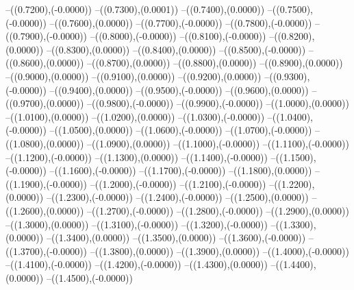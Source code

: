 {	--({\sx*(0.7200)},{\sy*(-0.0000)})
	--({\sx*(0.7300)},{\sy*(0.0001)})
	--({\sx*(0.7400)},{\sy*(0.0000)})
	--({\sx*(0.7500)},{\sy*(-0.0000)})
	--({\sx*(0.7600)},{\sy*(0.0000)})
	--({\sx*(0.7700)},{\sy*(-0.0000)})
	--({\sx*(0.7800)},{\sy*(-0.0000)})
	--({\sx*(0.7900)},{\sy*(-0.0000)})
	--({\sx*(0.8000)},{\sy*(-0.0000)})
	--({\sx*(0.8100)},{\sy*(-0.0000)})
	--({\sx*(0.8200)},{\sy*(0.0000)})
	--({\sx*(0.8300)},{\sy*(0.0000)})
	--({\sx*(0.8400)},{\sy*(0.0000)})
	--({\sx*(0.8500)},{\sy*(-0.0000)})
	--({\sx*(0.8600)},{\sy*(0.0000)})
	--({\sx*(0.8700)},{\sy*(0.0000)})
	--({\sx*(0.8800)},{\sy*(0.0000)})
	--({\sx*(0.8900)},{\sy*(0.0000)})
	--({\sx*(0.9000)},{\sy*(0.0000)})
	--({\sx*(0.9100)},{\sy*(0.0000)})
	--({\sx*(0.9200)},{\sy*(0.0000)})
	--({\sx*(0.9300)},{\sy*(-0.0000)})
	--({\sx*(0.9400)},{\sy*(0.0000)})
	--({\sx*(0.9500)},{\sy*(-0.0000)})
	--({\sx*(0.9600)},{\sy*(0.0000)})
	--({\sx*(0.9700)},{\sy*(0.0000)})
	--({\sx*(0.9800)},{\sy*(-0.0000)})
	--({\sx*(0.9900)},{\sy*(-0.0000)})
	--({\sx*(1.0000)},{\sy*(0.0000)})
	--({\sx*(1.0100)},{\sy*(0.0000)})
	--({\sx*(1.0200)},{\sy*(0.0000)})
	--({\sx*(1.0300)},{\sy*(-0.0000)})
	--({\sx*(1.0400)},{\sy*(-0.0000)})
	--({\sx*(1.0500)},{\sy*(0.0000)})
	--({\sx*(1.0600)},{\sy*(-0.0000)})
	--({\sx*(1.0700)},{\sy*(-0.0000)})
	--({\sx*(1.0800)},{\sy*(0.0000)})
	--({\sx*(1.0900)},{\sy*(0.0000)})
	--({\sx*(1.1000)},{\sy*(-0.0000)})
	--({\sx*(1.1100)},{\sy*(-0.0000)})
	--({\sx*(1.1200)},{\sy*(-0.0000)})
	--({\sx*(1.1300)},{\sy*(0.0000)})
	--({\sx*(1.1400)},{\sy*(-0.0000)})
	--({\sx*(1.1500)},{\sy*(-0.0000)})
	--({\sx*(1.1600)},{\sy*(-0.0000)})
	--({\sx*(1.1700)},{\sy*(-0.0000)})
	--({\sx*(1.1800)},{\sy*(0.0000)})
	--({\sx*(1.1900)},{\sy*(-0.0000)})
	--({\sx*(1.2000)},{\sy*(-0.0000)})
	--({\sx*(1.2100)},{\sy*(-0.0000)})
	--({\sx*(1.2200)},{\sy*(0.0000)})
	--({\sx*(1.2300)},{\sy*(-0.0000)})
	--({\sx*(1.2400)},{\sy*(-0.0000)})
	--({\sx*(1.2500)},{\sy*(0.0000)})
	--({\sx*(1.2600)},{\sy*(0.0000)})
	--({\sx*(1.2700)},{\sy*(-0.0000)})
	--({\sx*(1.2800)},{\sy*(-0.0000)})
	--({\sx*(1.2900)},{\sy*(0.0000)})
	--({\sx*(1.3000)},{\sy*(0.0000)})
	--({\sx*(1.3100)},{\sy*(-0.0000)})
	--({\sx*(1.3200)},{\sy*(-0.0000)})
	--({\sx*(1.3300)},{\sy*(0.0000)})
	--({\sx*(1.3400)},{\sy*(0.0000)})
	--({\sx*(1.3500)},{\sy*(0.0000)})
	--({\sx*(1.3600)},{\sy*(-0.0000)})
	--({\sx*(1.3700)},{\sy*(-0.0000)})
	--({\sx*(1.3800)},{\sy*(0.0000)})
	--({\sx*(1.3900)},{\sy*(0.0000)})
	--({\sx*(1.4000)},{\sy*(-0.0000)})
	--({\sx*(1.4100)},{\sy*(-0.0000)})
	--({\sx*(1.4200)},{\sy*(-0.0000)})
	--({\sx*(1.4300)},{\sy*(0.0000)})
	--({\sx*(1.4400)},{\sy*(0.0000)})
	--({\sx*(1.4500)},{\sy*(-0.0000)})
}
